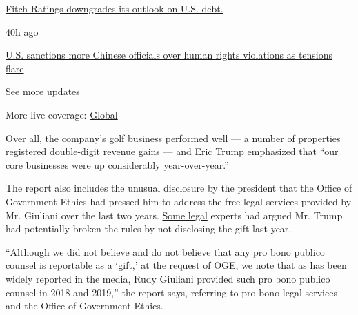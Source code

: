 \href{https://www.nytimes.com/live/2020/07/31/business/stock-market-today-coronavirus?action=click\&pgtype=Article\&state=default\&region=MAIN_CONTENT_1\&context=storylines_live_updates\#fitch-ratings-downgrades-its-outlook-on-us-debt}{Fitch
Ratings downgrades its outlook on U.S. debt.}

\href{https://www.nytimes.com/live/2020/07/31/business/stock-market-today-coronavirus?action=click\&pgtype=Article\&state=default\&region=MAIN_CONTENT_1\&context=storylines_live_updates\#us-sanctions-more-chinese-officials-over-human-rights-violations-as-tensions-flare}{40h
ago}

\href{https://www.nytimes.com/live/2020/07/31/business/stock-market-today-coronavirus?action=click\&pgtype=Article\&state=default\&region=MAIN_CONTENT_1\&context=storylines_live_updates\#us-sanctions-more-chinese-officials-over-human-rights-violations-as-tensions-flare}{U.S.
sanctions more Chinese officials over human rights violations as
tensions flare}

\href{https://www.nytimes.com/live/2020/07/31/business/stock-market-today-coronavirus?action=click\&pgtype=Article\&state=default\&region=MAIN_CONTENT_1\&context=storylines_live_updates}{See
more updates}

More live coverage:
\href{https://www.nytimes.com/2020/08/01/world/coronavirus-covid-19.html?action=click\&pgtype=Article\&state=default\&region=MAIN_CONTENT_1\&context=storylines_live_updates}{Global}

Over all, the company's golf business performed well --- a number of
properties registered double-digit revenue gains --- and Eric Trump
emphasized that ``our core businesses were up considerably
year-over-year.''

The report also includes the unusual disclosure by the president that
the Office of Government Ethics had pressed him to address the free
legal services provided by Mr. Giuliani over the last two years.
\href{https://www.nytimes.com/2019/12/13/us/politics/giuliani-trump-financial-disclosure.html}{Some
legal} experts had argued Mr. Trump had potentially broken the rules by
not disclosing the gift last year.

``Although we did not believe and do not believe that any pro bono
publico counsel is reportable as a `gift,' at the request of OGE, we
note that as has been widely reported in the media, Rudy Giuliani
provided such pro bono publico counsel in 2018 and 2019,'' the report
says, referring to pro bono legal services and the Office of Government
Ethics.

